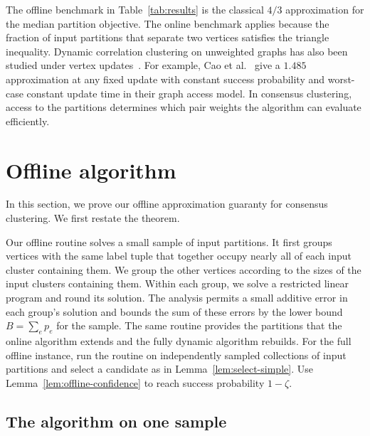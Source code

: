 \documentclass[11pt]{article}
\begin{document}
The offline benchmark in Table~\ref{tab:results} is the classical
$4/3$ approximation for the median partition objective. The
online benchmark applies because the fraction of input partitions
that separate two vertices satisfies the triangle inequality.
Dynamic correlation clustering on unweighted graphs has also been
studied under vertex updates~\cite{CLMP2024Dynamic,CaoEtAl2026Dynamic}.
For example, Cao et al.~\cite{CaoEtAl2026Dynamic} give a $1.485$
approximation at any fixed update with constant success probability
and worst-case constant update time in their graph access model.
In consensus clustering, access to the partitions determines which
pair weights the algorithm can evaluate efficiently.





\section{Offline algorithm}
\label{sec:offline}
In this section, we prove our offline approximation guaranty for consensus clustering. We first restate the theorem.

\OfflineMain*

Our offline routine solves a small sample of input partitions. It first groups
vertices with the same label tuple that together occupy nearly all of
each input cluster containing them.
We group the other vertices according to the sizes of the input clusters
containing them. Within each group, we solve a restricted linear program
and round its solution. The analysis permits a small additive error in each group's
solution and bounds the sum of these errors by the lower bound
$B=\sum_e p_e$ for the sample. The same routine provides the partitions that the
online algorithm extends and the fully dynamic algorithm rebuilds.
For the full offline instance, run the routine on independently
sampled collections of input partitions and select a candidate as in Lemma~\ref{lem:select-simple}.
Use Lemma~\ref{lem:offline-confidence} to reach success probability $1-\zeta$.

\subsection{The algorithm on one sample}
\label{sec:size-bands}
\end{document}
